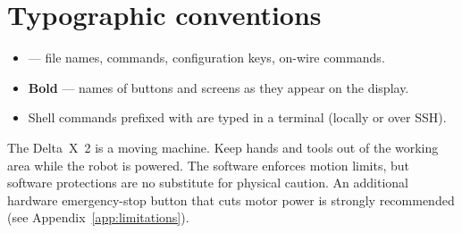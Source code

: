 \section{Typographic conventions}

\begin{itemize}[itemsep=2pt]
  \item {} --- file names, commands, configuration keys, on-wire commands.
  \item \textbf{Bold} --- names of buttons and screens as they appear on the display.
  \item Shell commands prefixed with \code{\$} are typed in a terminal (locally or over SSH).
\end{itemize}

\begin{warning}
The Delta~X~2 is a moving machine. Keep hands and tools out of the working area while
the robot is powered. The software enforces motion limits, but software protections
are no substitute for physical caution. An additional hardware emergency-stop button
that cuts motor power is strongly recommended (see Appendix~\ref{app:limitations}).
\end{warning}
